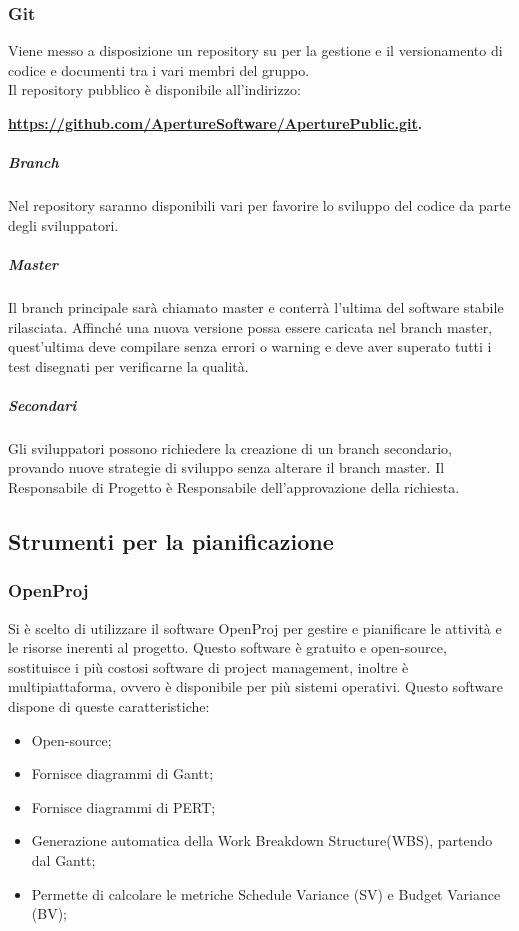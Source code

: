 \subsubsection{Git}
\label{4.3}
Viene messo a disposizione un repository  su  per la gestione e il versionamento di codice e documenti tra i vari membri del gruppo.\\
Il repository pubblico è disponibile all'indirizzo: \\
\begin{center}
\textbf{\url{https://github.com/ApertureSoftware/AperturePublic.git}.}
\end{center}

\subparagraph{Branch \\}
\label{4.4}
Nel repository saranno disponibili vari  per favorire lo sviluppo del codice da parte degli sviluppatori.

\subparagraph{Master \\}
\label{4.4.1}
Il branch principale sarà chiamato master e conterrà l'ultima  del software stabile rilasciata. Affinché una nuova versione possa essere caricata nel branch master, quest'ultima deve compilare senza errori o warning e deve aver superato tutti i test disegnati per verificarne la qualità.

\subparagraph{Secondari \\}
\label{4.4.2}
Gli sviluppatori possono richiedere la creazione di un branch secondario, provando nuove strategie di sviluppo senza alterare il branch master. Il Responsabile di Progetto è Responsabile dell'approvazione della richiesta.

\subsection{Strumenti per la pianificazione}
\label{}
\subsubsection{OpenProj}
Si è scelto di utilizzare il software OpenProj per gestire e pianificare le attività e le risorse inerenti al progetto.
Questo software è gratuito e open-source, sostituisce i più costosi software di project management, inoltre è multipiattaforma, ovvero è disponibile per più sistemi operativi.
Questo software dispone di queste caratteristiche:
\begin{itemize}
\item Open-source;
\item Fornisce diagrammi di Gantt;
\item Fornisce diagrammi di PERT;
\item Generazione automatica della Work Breakdown Structure(WBS), partendo dal Gantt;
\item Permette di calcolare le metriche Schedule Variance (SV) e Budget Variance (BV);
\end{itemize}
\label{}


